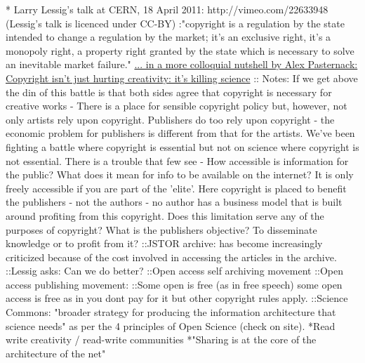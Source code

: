 \documentclass[final,authoryear,3p]{elsarticle-open-drafting}
\begin{document}
\begin{enumerate}
* Larry Lessig's talk at CERN, 18 April 2011: http://vimeo.com/22633948 (Lessig's talk is licenced under CC-BY) 
:"copyright is a regulation by the state intended to change a regulation by the market; it's an exclusive right, it's a monopoly right, a property right granted by the state which is necessary to solve an inevitable market failure." \href{http://motherboard.tv/2011/4/25/lessig-copyright-isn-t-just-hurting-creativity-it-s-killing-science-video--2}{ ... in a more colloquial nutshell by Alex Pasternack: Copyright isn't just hurting creativity: it's killing science} 
:: Notes: If we get above the din of this battle is that both sides agree that copyright is necessary for creative works - There is a place for sensible copyright policy but, however, not only artists rely upon copyright. Publishers do too rely upon copyright - the economic problem for publishers is different from that for the artists. We've been fighting a battle where copyright is essential but not on science where copyright is not essential. There is a trouble that few see - How accessible is information for the public? What does it mean for info to be available on the internet? It is only freely accessible if you are part of the 'elite'. Here copyright is placed to benefit the publishers - not the authors - no author has a business model that is built around profiting from this copyright. Does this limitation serve any of the purposes of copyright? What is the publishers objective? To disseminate knowledge or to profit from it? 
::JSTOR archive: has become increasingly criticized because of the cost involved in accessing the articles in the archive. 
::Lessig asks: Can we do better? 
::Open access self archiving movement
::Open access publishing movement:
::Some open is free (as in free speech) some open access is free as in you dont pay for it but other copyright rules apply.
::Science Commons: "broader strategy for producing the information architecture that science needs" as per the 4 principles of Open Science (check on site).
*Read write creativity / read-write communities
*"Sharing is at the core of the architecture of the net"

\end{enumerate}
\end{document}
